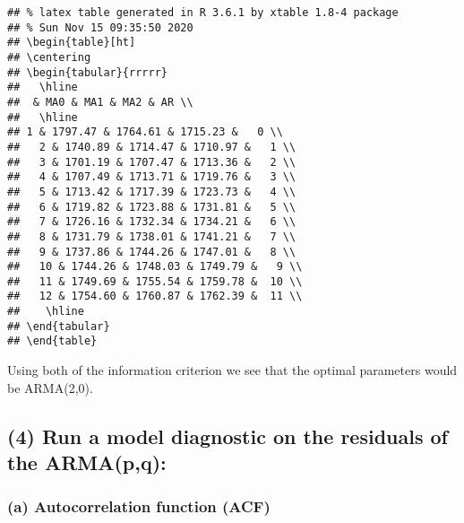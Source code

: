 \documentclass[]{article}
\begin{document}
\begin{verbatim}
## % latex table generated in R 3.6.1 by xtable 1.8-4 package
## % Sun Nov 15 09:35:50 2020
## \begin{table}[ht]
## \centering
## \begin{tabular}{rrrrr}
##   \hline
##  & MA0 & MA1 & MA2 & AR \\ 
##   \hline
## 1 & 1797.47 & 1764.61 & 1715.23 &   0 \\ 
##   2 & 1740.89 & 1714.47 & 1710.97 &   1 \\ 
##   3 & 1701.19 & 1707.47 & 1713.36 &   2 \\ 
##   4 & 1707.49 & 1713.71 & 1719.76 &   3 \\ 
##   5 & 1713.42 & 1717.39 & 1723.73 &   4 \\ 
##   6 & 1719.82 & 1723.88 & 1731.81 &   5 \\ 
##   7 & 1726.16 & 1732.34 & 1734.21 &   6 \\ 
##   8 & 1731.79 & 1738.01 & 1741.21 &   7 \\ 
##   9 & 1737.86 & 1744.26 & 1747.01 &   8 \\ 
##   10 & 1744.26 & 1748.03 & 1749.79 &   9 \\ 
##   11 & 1749.69 & 1755.54 & 1759.78 &  10 \\ 
##   12 & 1754.60 & 1760.87 & 1762.39 &  11 \\ 
##    \hline
## \end{tabular}
## \end{table}
\end{verbatim}

Using both of the information criterion we see that the optimal
parameters would be ARMA(2,0).

\hypertarget{run-a-model-diagnostic-on-the-residuals-of-the-armapq}{%
\subsection{\texorpdfstring{\textbf{(4)} Run a model diagnostic on the
residuals of the
ARMA(p,q):}{(4) Run a model diagnostic on the residuals of the ARMA(p,q):}}\label{run-a-model-diagnostic-on-the-residuals-of-the-armapq}}

\hypertarget{a-autocorrelation-function-acf-1}{%
\subsubsection{\texorpdfstring{\textbf{(a)} Autocorrelation function
(ACF)}{(a) Autocorrelation function (ACF)}}\label{a-autocorrelation-function-acf-1}}
\end{document}

